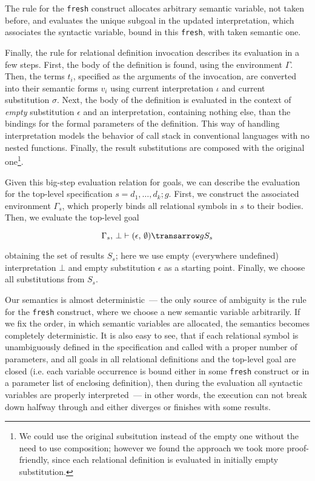 The rule for the \lstinline|fresh| construct allocates arbitrary semantic variable, not taken before, and evaluates the unique subgoal in the updated interpretation, which
associates the syntactic variable, bound in this \lstinline|fresh|, with taken semantic one.

Finally, the rule for relational definition invocation describes its evaluation in a few steps. First, the body of the definition is found, using the environment $\Gamma$. 
Then, the terms $t_i$, specified as the arguments of the invocation, are converted into their semantic forms $v_i$ using current interpretation $\iota$ and current 
substitution $\sigma$. Next, the body of the definition is evaluated in the context of \emph{empty} substitution $\epsilon$ and an interpretation, containing nothing
else, than the bindings for the formal parameters of the definition. This way of handling interpretation models the behavior of call stack in conventional languages
with no nested functions. Finally, the result substitutions are composed with the original one\footnote{We could use the original
subsitution instead of the empty one without the need to use composition; however we found the approach we took more proof-friendly, since each relational definition is evaluated
in initially empty substitution.}. 

Given this big-step evaluation relation for goals, we can describe the evaluation for the top-level specification $s=d_1,\dots,d_k;g$. First, we construct the associated environment
$\Gamma_s$, which properly binds all relational symbols in $s$ to their bodies. Then, we evaluate the top-level goal

$$
\otrans{\Gamma_s,\,\bot}{(\epsilon,\,\emptyset)}{g}{S_s}
$$

\noindent obtaining the set of results $S_s$; here we use empty (everywhere undefined) interpretation $\bot$ and empty substitution $\epsilon$ as a starting point. 
Finally, we choose all substitutions from $S_s$. 

Our semantics is almost deterministic~--- the only source of ambiguity is the rule for the \lstinline|fresh| construct, where we choose a new semantic variable
arbitrarily. If we fix the order, in which semantic variables are allocated, the semantics becomes completely deterministic. It is also easy to see, that if each
relational symbol is unambiguously defined in the specification and called with a proper number of parameters, and all goals in all relational definitions and the 
top-level goal are closed (i.e. each variable occurrence is bound either in some \lstinline|fresh| construct or in a parameter list of enclosing definition), 
then during the evaluation all syntactic variables are properly interpreted~--- in other words, the execution can not break down halfway through and either diverges or 
finishes with some results.

